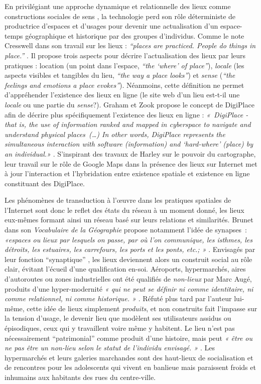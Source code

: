 En privilégiant une approche dynamique et relationnelle des lieux comme constructions sociales de sens \citep{Kyle2007}, la technologie perd son rôle déterministe de productrice d’espaces et d’usages pour devenir une actualisation d’un espace-temps géographique et historique par des groupes d’individus. Comme le note Cresswell dans son travail sur les lieux : \textit{“places are practiced. People do things in place.”} \citep{Cresswell2004}. Il propose trois aspects pour décrire l’actualisation des lieux par leurs pratiques : location (un point dans l’espace, \textit{“the ‘where’ of place”}), \textit{locale} (les aspects visibles et tangibles du lieu, \textit{“the way a place looks”}) et \textit{sense} (\textit{“the feelings and emotions a place evokes”}). Néanmoins, cette définition ne permet d’appréhender l’existence des lieux en ligne (le site web d’un lieu est-t-il une \textit{locale} ou une partie du \textit{sense}?). Graham et Zook propose le concept de DigiPlace afin de décrire plus spécifiquement l’existence des lieux en ligne : \textit{« DigiPlace - that is, the use of information ranked and mapped in cyberspace to navigate and understand physical places (…) In other words, DigiPlace represents the simultaneous interaction with software (information) and `hard-where' (place) by an individual.»} \citep{Zook2007}. S’inspirant des travaux de Harley sur le pouvoir du cartographe, leur travail sur le rôle de Google Maps dans la présence des lieux sur Internet met à jour l’interaction et l’hybridation entre existence spatiale et existence en ligne constituant des DigiPlace. 

Les phénomènes de transduction à l’œuvre dans les pratiques spatiales de l’Internet sont donc le reflet des états du réseau à un moment donné, les lieux eux-mêmes formant ainsi un réseau basé sur leurs relations et similarités. Brunet dans son \textit{Vocabulaire de la Géographie} propose notamment l’idée de synapses : \textit{«espaces ou lieux par lesquels on passe, par où l'on communique, les isthmes, les détroits, les estuaires, les carrefours, les ports et les ponts, etc.; »} \citep{Brunet1993}. Envisagés par leur fonction “synaptique” , les lieux deviennent alors un construit social au rôle clair, évitant l’écueil d’une qualification en-soi. Aéroports, hypermarchés, aires d’autoroutes ou zones industrielles ont été qualifiés de \textit{non-lieux} par Marc Augé, produits d’une  hyper-modernité \textit{« qui ne peut se définir ni comme identitaire, ni comme relationnel, ni comme historique. »} \citep{Augé1995}. Réfuté plus tard par l’auteur lui-même, cette idée de lieux simplement \textit{produits}, et non construits fait l’impasse sur la tension d’usage, le devenir lieu que modèlent ses utilisateurs assidus ou épisodiques, ceux qui y travaillent voire même y habitent. Le lieu n’est pas nécessairement “patrimonial” comme produit d’une histoire, mais peut \textit{« être ou ne pas être un non-lieu selon le statut de l'individu envisagé. »} \citep{Debarbieux1993}. Les hypermarchés et leurs galeries marchandes sont des haut-lieux de socialisation et de rencontres pour les adolescents qui vivent en banlieue \citep{Matthews2000} mais paraissent froids et inhumains aux habitants des rues du centre-ville.

